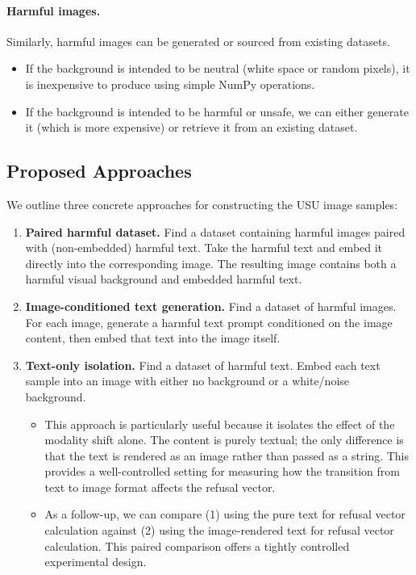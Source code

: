 \documentclass[11pt]{article}
\begin{document}
\paragraph{Harmful images.} Similarly, harmful images can be generated or sourced from existing datasets.
\begin{itemize}
    \item If the background is intended to be neutral (white space or random pixels), it is inexpensive to produce using simple NumPy operations.
    \item If the background is intended to be harmful or unsafe, we can either generate it (which is more expensive) or retrieve it from an existing dataset.
\end{itemize}

\subsection{Proposed Approaches}

We outline three concrete approaches for constructing the USU image samples:

\begin{enumerate}
    \item \textbf{Paired harmful dataset.} Find a dataset containing harmful images paired with (non-embedded) harmful text. Take the harmful text and embed it directly into the corresponding image. The resulting image contains both a harmful visual background and embedded harmful text.

    \item \textbf{Image-conditioned text generation.} Find a dataset of harmful images. For each image, generate a harmful text prompt conditioned on the image content, then embed that text into the image itself.

    \item \textbf{Text-only isolation.} Find a dataset of harmful text. Embed each text sample into an image with either no background or a white/noise background.
    \begin{itemize}
        \item This approach is particularly useful because it isolates the effect of the modality shift alone. The content is purely textual; the only difference is that the text is rendered as an image rather than passed as a string. This provides a well-controlled setting for measuring how the transition from text to image format affects the refusal vector.
        \item As a follow-up, we can compare (1) using the pure text for refusal vector calculation against (2) using the image-rendered text for refusal vector calculation. This paired comparison offers a tightly controlled experimental design.
    \end{itemize}
\end{enumerate}
\end{document}
